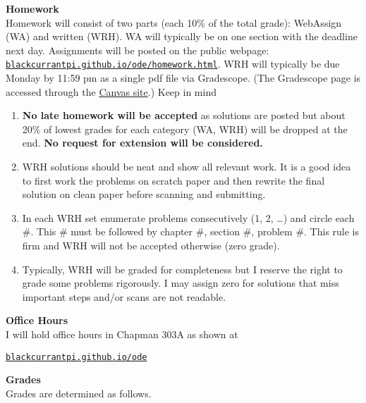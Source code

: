 \documentclass[12pt]{article}
\renewcommand{\emph}[1]{\textsf{\textbf{#1}}}
\newcommand{\localhead}[1]{\par\smallskip\textbf{#1}\nobreak\\}%
\def\heading#1{\localhead{\large\emph{#1}}}
\def\subheading#1{\localhead{\emph{#1}}}
\begin{document}
\subheading{Homework}
Homework will consist of two parts (each 10\% of the total grade): WebAssign (WA)
and written (WRH). WA will typically be on one section with the deadline next day.
Assignments will be posted on the public webpage:
{\href{https://blackcurrantpi.github.io/ode/homework.html}{\tt blackcurrantpi.github.io/ode/homework.html}}.
WRH will typically be
due Monday by 11:59 pm as a single pdf file via Gradescope. (The Gradescope page is accessed through the \href{https://canvas.alaska.edu/courses/27085}{Canvas site}.) Keep in mind
\begin{enumerate}%
    \item \textbf{No late homework will be accepted} as solutions are posted but about 20\% of lowest grades for each category (WA, WRH) will be dropped at the end. \textbf{No request for extension will be considered.}
    \item WRH solutions should be neat and show all relevant work. It is a good idea to first work the problems on scratch paper and then rewrite the final solution on clean paper before scanning and submitting.
    \item In each WRH set enumerate problems consecutively (1, 2, \dots) and circle each \#. This \# must be followed by chapter \#, section \#, problem \#. This rule is firm and WRH will not be accepted otherwise (zero grade).
    \item Typically, WRH will be graded for completeness but I reserve the right to grade some problems rigorously. I may assign zero for solutions that miss important steps and/or scans are not readable.
\end{enumerate}


\heading{Office Hours}
I will hold office hours in Chapman 303A as shown at

\smallskip
\centerline{\href{http://blackcurrantpi.github.io/ode}{\tt blackcurrantpi.github.io/ode}}


\heading{Grades}
Grades are determined as follows.
\end{document}
